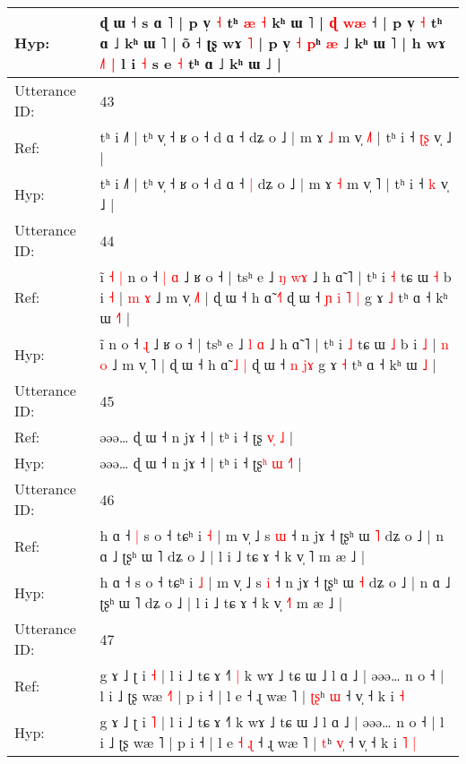\documentclass[10pt]{article}
\DeclareRobustCommand{\hl}[1]{{\textcolor{red}{#1}}}
\begin{document}
\begin{longtable}{ll}
Hyp: & ɖ ɯ ˧ s ɑ ˥ | p v̩ \hl{˧} tʰ \hl{æ} \hl{˧} kʰ ɯ ˥ |\hl{}\hl{}\hl{}\hl{}\hl{} \hl{ɖ} \hl{w}\hl{æ} ˧ | p v̩ \hl{˧} tʰ ɑ ˩ kʰ ɯ ˥ | õ ˧ ʈʂ wɤ \hl{˥} | p v̩ \hl{˧} \hl{p}ʰ \hl{æ} ˩ kʰ ɯ ˥ | h wɤ\hl{ }\hl{˩}\hl{˥} \hl{|} l i \hl{˧} s e \hl{˧} tʰ ɑ ˩ kʰ ɯ ˩ |
 \\
\midrule
Utterance ID: & 43 \\
Ref: & tʰ i ˩˥ | tʰ v̩ ˧ ʁ o ˧ d ɑ ˧\hl{}\hl{} dʑ o ˩ | m ɤ \hl{˩} m v̩ \hl{˩}˥ | tʰ i ˧ \hl{ʈ}\hl{ʂ} v̩ ˩ |
 \\
Hyp: & tʰ i ˩˥ | tʰ v̩ ˧ ʁ o ˧ d ɑ ˧\hl{ }\hl{|} dʑ o ˩ | m ɤ \hl{˧} m v̩ \hl{}˥ | tʰ i ˧ \hl{}\hl{k} v̩ ˩ |
 \\
\midrule
Utterance ID: & 44 \\
Ref: & ĩ\hl{ }\hl{˧}\hl{ }\hl{|} n o ˧\hl{ }\hl{|} \hl{ɑ} ˩ ʁ o ˧ | tsʰ e ˩ \hl{ŋ} \hl{w}\hl{ɤ} ˩ h ɑ̃ ˥ | tʰ i \hl{˧} tɕ ɯ \hl{˧} b i \hl{˧} | \hl{m} \hl{ɤ} ˩ m v̩ \hl{˩}˥ | ɖ ɯ ˧ h ɑ̃ \hl{}\hl{˧}\hl{˥} ɖ ɯ ˧\hl{ }\hl{ɲ} \hl{i} \hl{˥}\hl{ }\hl{|} g ɤ \hl{˩} tʰ ɑ ˧ kʰ ɯ \hl{˧}\hl{˥} |
 \\
Hyp: & ĩ\hl{}\hl{}\hl{}\hl{} n o ˧\hl{}\hl{} \hl{ɻ} ˩ ʁ o ˧ | tsʰ e ˩ \hl{l} \hl{}\hl{ɑ} ˩ h ɑ̃ ˥ | tʰ i \hl{˩} tɕ ɯ \hl{˩} b i \hl{˩} | \hl{n} \hl{o} ˩ m v̩ \hl{}˥ | ɖ ɯ ˧ h ɑ̃ \hl{˩}\hl{ }\hl{|} ɖ ɯ ˧\hl{}\hl{} \hl{n} \hl{}\hl{j}\hl{ɤ} g ɤ \hl{˧} tʰ ɑ ˧ kʰ ɯ \hl{}\hl{˩} |
 \\
\midrule
Utterance ID: & 45 \\
Ref: & əəə… ɖ ɯ ˧ n jɤ ˧ | tʰ i ˧ ʈʂ\hl{} \hl{v}\hl{̩}\hl{ }\hl{˩} |
 \\
Hyp: & əəə… ɖ ɯ ˧ n jɤ ˧ | tʰ i ˧ ʈʂ\hl{ʰ} \hl{ɯ}\hl{ }\hl{˧}\hl{˥} |
 \\
\midrule
Utterance ID: & 46 \\
Ref: & h ɑ ˧\hl{ }\hl{|} s o ˧ tɕʰ i \hl{˧} | m v̩ ˩ s \hl{ɯ} ˧ n jɤ ˧ ʈʂʰ ɯ \hl{˥} dʑ o ˩ | n ɑ ˩ ʈʂʰ ɯ ˥ dʑ o ˩ | l i ˩ tɕ ɤ ˧ k v̩ \hl{}˥ m æ ˩ |
 \\
Hyp: & h ɑ ˧\hl{}\hl{} s o ˧ tɕʰ i \hl{˩} | m v̩ ˩ s \hl{i} ˧ n jɤ ˧ ʈʂʰ ɯ \hl{˧} dʑ o ˩ | n ɑ ˩ ʈʂʰ ɯ ˥ dʑ o ˩ | l i ˩ tɕ ɤ ˧ k v̩ \hl{˧}˥ m æ ˩ |
 \\
\midrule
Utterance ID: & 47 \\
Ref: & g ɤ ˩ ʈ i \hl{˧} | l i ˩ tɕ ɤ ˧˥\hl{ }\hl{|} k wɤ ˩ tɕ ɯ ˩ l ɑ ˩ | əəə… n o ˧ | l i ˩ ʈʂ wæ \hl{˧}˥ | p i ˧ | l e\hl{}\hl{}\hl{}\hl{} ˧ ɻ wæ ˥ | \hl{ʈ}\hl{ʂ}ʰ \hl{}\hl{ɯ} ˧ v̩ ˧ k i\hl{}\hl{} \hl{˧}
 \\
Hyp: & g ɤ ˩ ʈ i \hl{˥} | l i ˩ tɕ ɤ ˧˥\hl{}\hl{} k wɤ ˩ tɕ ɯ ˩ l ɑ ˩ | əəə… n o ˧ | l i ˩ ʈʂ wæ \hl{}˥ | p i ˧ | l e\hl{ }\hl{˧}\hl{ }\hl{ɻ} ˧ ɻ wæ ˥ | \hl{}\hl{t}ʰ \hl{v}\hl{̩} ˧ v̩ ˧ k i\hl{ }\hl{˥} \hl{|}

\end{longtable}
\end{document}
